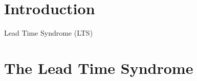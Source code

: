 \documentclass[dvips,mnsc]{informs3}
\begin{document}
\maketitle

%


\section{Introduction}
\label{sec:introduction}

Lead Time Syndrome (LTS)


\section{The Lead Time Syndrome}
\label{sec:The_Lead_Time_Syndrome}
\end{document}
